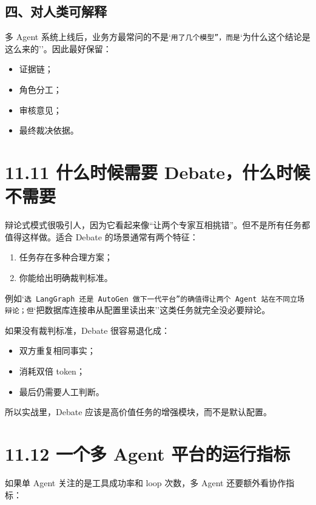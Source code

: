 \subsection{四、对人类可解释}

多 Agent 系统上线后，业务方最常问的不是`\texttt{用了几个模型''，而是}`为什么这个结论是这么来的''。因此最好保留：


\begin{itemize}[leftmargin=2em]
\item 证据链；
\item 角色分工；
\item 审核意见；
\item 最终裁决依据。
\end{itemize}

\section{11.11 什么时候需要 Debate，什么时候不需要}

辩论式模式很吸引人，因为它看起来像``让两个专家互相挑错''。但不是所有任务都值得这样做。适合 Debate 的场景通常有两个特征：


\begin{enumerate}[leftmargin=2em]
\item 任务存在多种合理方案；
\item 你能给出明确裁判标准。
\end{enumerate}

例如`\texttt{选 LangGraph 还是 AutoGen 做下一代平台''的确值得让两个 Agent 站在不同立场辩论；但}`把数据库连接串从配置里读出来''这类任务就完全没必要辩论。


如果没有裁判标准，Debate 很容易退化成：


\begin{itemize}[leftmargin=2em]
\item 双方重复相同事实；
\item 消耗双倍 token；
\item 最后仍需要人工判断。
\end{itemize}

所以实战里，Debate 应该是高价值任务的增强模块，而不是默认配置。


\section{11.12 一个多 Agent 平台的运行指标}

如果单 Agent 关注的是工具成功率和 loop 次数，多 Agent 还要额外看协作指标：


